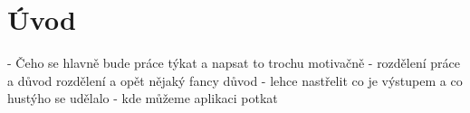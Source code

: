 \chapter{Úvod}
- Čeho se hlavně bude práce týkat a napsat to trochu motivačně
- rozdělení práce a důvod rozdělení a opět nějaký fancy důvod
- lehce nastřelit co je výstupem a co hustýho se udělalo
- kde můžeme aplikaci potkat

\newpage